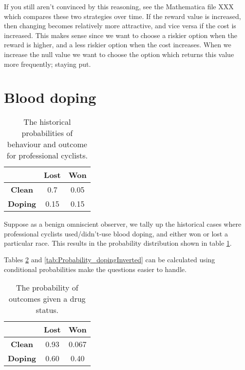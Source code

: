 \documentclass[11pt,fullpage]{book}
\begin{document}
If you still aren't convinced by this reasoning, see the Mathematica file XXX which compares these two strategies over time. If the reward value is increased, then changing becomes relatively more attractive, and vice versa if the cost is increased. This makes sense since we want to choose a riskier option when the reward is higher, and a less riskier option when the cost increases. When we increase the null value we want to choose the option which returns this value more frequently; staying put.

\section{Blood doping}
\begin{table}[htbp]
  \centering
    \begin{tabular}{ccc}
    \toprule
          & \textbf{Lost} & \textbf{Won} \\
    \midrule
    \textbf{Clean} & 0.7   & 0.05 \\
    \textbf{Doping} & 0.15  & 0.15 \\
    \bottomrule
    \end{tabular}%
    \caption{The historical probabilities of behaviour and outcome for professional cyclists.}
  \label{tab:Probability_PS_bloodDoping}%
\end{table}%

Suppose as a benign omniscient observer, we tally up the historical cases where professional cyclists used/didn't-use blood doping, and either won or lost a particular race. This results in the probability distribution shown in table \ref{tab:Probability_PS_bloodDoping}.

Tables \ref{tab:Probability_dopingNormal} and \ref{tab:Probability_dopingInverted} can be calculated using conditional probabilities make the questions easier to handle.

\begin{table}[htbp]
  \centering
    \begin{tabular}{ccc}
    \toprule
    & \textbf{Lost} & \textbf{Won} \\
    \midrule
    \textbf{Clean} & 0.93  & 0.067 \\
    \textbf{Doping} & 0.60  & 0.40 \\
    \bottomrule
    \end{tabular}%
  \caption{The probability of outcomes given a drug status.}%
  \label{tab:Probability_dopingNormal}
\end{table}%
\end{document}
